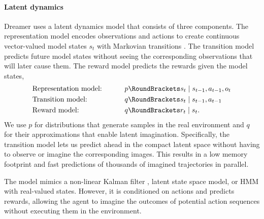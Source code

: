 \paragraph{Latent dynamics}

Dreamer uses a latent dynamics model that consists of three components. The representation model encodes observations and actions to create continuous vector-valued model states $s_t$ with Markovian transitions \citep{watter2015e2c,zhang2018solar,hafner2018planet}. The transition model predicts future model states without seeing the corresponding observations that will later cause them. The reward model predicts the rewards given the model states,
\begin{gather}
\begin{aligned}
\makebox[12em][l]{Representation model:} && &\p(s_t|s_{t-1},a_{t-1},o_t) \\
\makebox[12em][l]{Transition model:} && &\q(s_t|s_{t-1},a_{t-1}) \\
\makebox[12em][l]{Reward model:} && &\q(r_t|s_t).
\label{eq:latent_dynamics}
\end{aligned}
\end{gather}%
We use $p$ for distributions that generate samples in the real environment and $q$ for their approximations that enable latent imagination. Specifically, the transition model lets us predict ahead in the compact latent space without having to observe or imagine the corresponding images. This results in a low memory footprint and fast predictions of thousands of imagined trajectories in parallel.

The model mimics a non-linear Kalman filter \citep{kalman1960filter}, latent state space model, or HMM with real-valued states. However, it is conditioned on actions and predicts rewards, allowing the agent to imagine the outcomes of potential action sequences without executing them in the environment.

\pagebreak